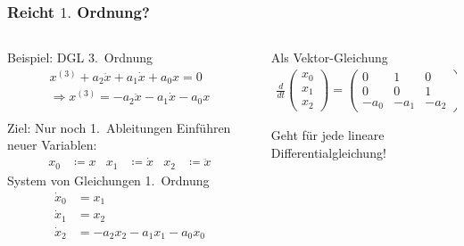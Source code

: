 %
%
%
\bgroup
\begin{frame}[t]
\setlength{\abovedisplayskip}{5pt}
\setlength{\belowdisplayskip}{5pt}
\frametitle{Reicht $1.$ Ordnung?}
\vspace{-20pt}
\begin{columns}[t,onlytextwidth]
\begin{column}{0.48\textwidth}
\begin{block}{Beispiel: DGL 3.~Ordnung} \vspace*{-1ex}
  \begin{align*}
    x^{(3)} + a_2 \ddot x + a_1 \dot x + a_0 x = 0 \\
    \Rightarrow
     x^{(3)} = -a_2 \ddot x - a_1 \dot x - a_0 x
  \end{align*}
\end{block}
\begin{block}{Ziel: Nur noch 1.~Ableitungen}
  Einführen neuer Variablen:
    \begin{align*}
    x_0 &\coloneqq x &
    x_1 &\coloneqq \dot  x &
    x_2 &\coloneqq \ddot x
  \end{align*}
System von Gleichungen 1.~Ordnung
  \begin{align*}
  \dot x_0 &= x_1 \\
  \dot x_1 &= x_2 \\
  \dot x_2 &= -a_2 x_2 - a_1 x_1 - a_0 x_0
\end{align*}
\end{block}
\end{column}
\begin{column}{0.48\textwidth}
\begin{block}{Als Vektor-Gleichung} \vspace*{-1ex}
  \begin{align*}
    \frac{d}{dt}
    \begin{pmatrix} x_0 \\ x_1 \\ x_2 \end{pmatrix}
    = \begin{pmatrix}
      0     & 1     & 0   \\
      0     & 0     & 1   \\
      -a_0  & -a_1  & -a_2 
    \end{pmatrix}
    \begin{pmatrix} x_0 \\ x_1 \\ x_2 \end{pmatrix}    
  \end{align*}

  Geht für jede lineare Differentialgleichung!
  
\end{block}
\end{column}
\end{columns}
\end{frame}
\egroup
